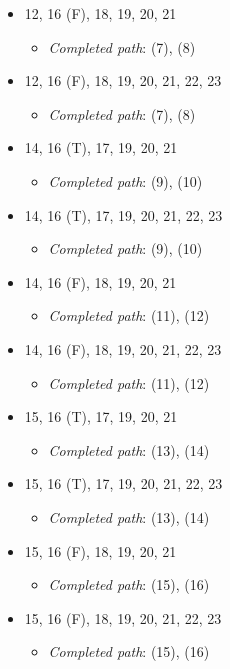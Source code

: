 \documentclass{article}
\newcommand{\completedpath}{\textit{Completed path}}
\begin{document}
\begin{itemize}
          \begin{itemize}
              \item \completedpath: (5), (6)
          \end{itemize}
    \item 12, 16 (F), 18, 19, 20, 21
          \begin{itemize}
              \item \completedpath: (7), (8)
          \end{itemize}
    \item 12, 16 (F), 18, 19, 20, 21, 22, 23
          \begin{itemize}
              \item \completedpath: (7), (8)
          \end{itemize}
    \item 14, 16 (T), 17, 19, 20, 21
          \begin{itemize}
              \item \completedpath: (9), (10)
          \end{itemize}
    \item 14, 16 (T), 17, 19, 20, 21, 22, 23
          \begin{itemize}
              \item \completedpath: (9), (10)
          \end{itemize}
    \item 14, 16 (F), 18, 19, 20, 21
          \begin{itemize}
              \item \completedpath: (11), (12)
          \end{itemize}
    \item 14, 16 (F), 18, 19, 20, 21, 22, 23
          \begin{itemize}
              \item \completedpath: (11), (12)
          \end{itemize}
    \item 15, 16 (T), 17, 19, 20, 21
          \begin{itemize}
              \item \completedpath: (13), (14)
          \end{itemize}
    \item 15, 16 (T), 17, 19, 20, 21, 22, 23
          \begin{itemize}
              \item \completedpath: (13), (14)
          \end{itemize}
    \item 15, 16 (F), 18, 19, 20, 21
          \begin{itemize}
              \item \completedpath: (15), (16)
          \end{itemize}
    \item 15, 16 (F), 18, 19, 20, 21, 22, 23
          \begin{itemize}
              \item \completedpath: (15), (16)
          \end{itemize}
\end{itemize}
\end{document}
